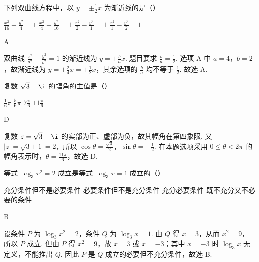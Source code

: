 \begin{problem}

下列双曲线方程中，以 \(y = \pm \frac{1}{2}x \) 为渐近线的是（\quad）

\choices
    {\(\frac{x^{2}}{16}-\frac{y^{2}}{4}=1 \)}
    {\(\frac{x^{2}}{4}-\frac{y^{2}}{16}=1 \)}
    {\(\frac{x^{2}}{2}-\frac{y^{2}}{1}=1 \)}
    {\(\frac{x^{2}}{1}-\frac{y^{2}}{2}=1 \)}
\end{problem}

\begin{answer}
A
\end{answer}

\begin{solution}
双曲线 \(\frac{x^{2}}{a^{2}}-\frac{y^{2}}{b^{2}}=1\) 的渐近线为 \(y=\pm\frac{b}{a}x\). 题目要求 \(\frac{b}{a}=\frac12\). 选项 A 中 \(a=4\)，\(b=2\)，故渐近线为 \(y=\pm\frac{2}{4}x=\pm\frac12x\)，其余选项的 \(\frac{b}{a}\) 均不等于 \(\frac12\). 故选 A.
\end{solution}

\begin{problem}

复数 \(\sqrt{3} - \i\) 的幅角的主值是（\quad）

\choices
    {\(\frac{1}{6}\pi\)}
    {\(\frac{5}{6}\pi\)}
    {\(7\frac{\pi}{6}\)}
    {\(11\frac{\pi}{6}\)}
\end{problem}

\begin{answer}
D
\end{answer}

\begin{solution}
复数 \(z=\sqrt3-\i\) 的实部为正、虚部为负，故其幅角在第四象限. 又 \(|z|=\sqrt{3+1}=2\)，所以 \(\cos\theta=\frac{\sqrt3}{2}\)，\(\sin\theta=-\frac12\). 在本题选项采用 \(0\leqslant\theta<2\pi\) 的幅角表示时，\(\theta=\frac{11\pi}{6}\)，故选 D.
\end{solution}

\begin{problem}

等式 \(\log_3 x^2 = 2\) 成立是等式 \(\log_3 x = 1\) 成立的（\quad）

\choices
    {充分条件但不是必要条件}
    {必要条件但不是充分条件}
    {充分必要条件}
    {既不充分又不必要的条件}
\end{problem}

\begin{answer}
B
\end{answer}

\begin{solution}
设条件 \(P\) 为 \(\log_{3}x^{2}=2\)，条件 \(Q\) 为 \(\log_{3}x=1\). 由 \(Q\) 得 \(x=3\)，从而 \(x^{2}=9\)，所以 \(P\) 成立. 但由 \(P\) 得 \(x^{2}=9\)，故 \(x=3\) 或 \(x=-3\)；其中 \(x=-3\) 时 \(\log_{3}x\) 无定义，不能推出 \(Q\). 因此 \(P\) 是 \(Q\) 成立的必要但不充分条件，故选 B.
\end{solution}

